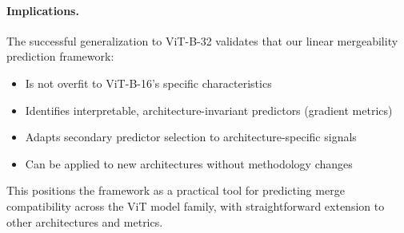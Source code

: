 \paragraph{Implications.}
The successful generalization to ViT-B-32 validates that our linear mergeability prediction framework:
\begin{itemize}
    \item Is not overfit to ViT-B-16's specific characteristics
    \item Identifies interpretable, architecture-invariant predictors (gradient metrics)
    \item Adapts secondary predictor selection to architecture-specific signals
    \item Can be applied to new architectures without methodology changes
\end{itemize}

This positions the framework as a practical tool for predicting merge compatibility across the ViT model family, with straightforward extension to other architectures and metrics.
